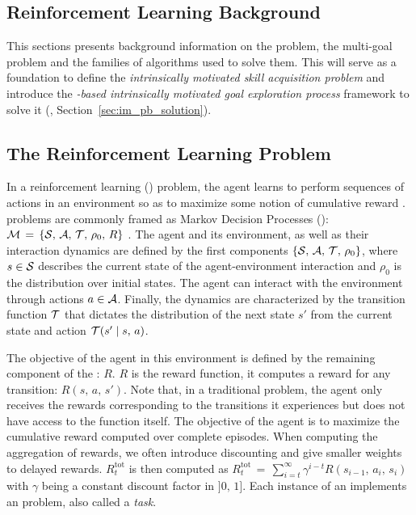 

\subsection{Reinforcement Learning Background}
\label{sec:background}
This sections presents background information on the \rl problem, the multi-goal \rl problem and the families of algorithms used to solve them. This will serve as a foundation to define the \textit{intrinsically motivated skill acquisition problem} and introduce the  \textit{\textsl{\rl}-based intrinsically motivated goal exploration process} framework to solve it (\rlimgep, Section~\ref{sec:im_pb_solution}).

\subsection{The Reinforcement Learning Problem}
In a reinforcement learning (\rl) problem, the agent learns to perform sequences of actions in an environment so as to maximize some notion of cumulative reward \cite{sutton2018reinforcement}. \rl problems are commonly framed as Markov Decision Processes (\mdps): $\mathcal{M}\,=\,\{\mathcal{S},\,\mathcal{A},\,\mathcal{T},\,\rho_0,\,R\}$ \cite{sutton2018reinforcement}. The agent and its environment, as well as their interaction dynamics are defined by the first components $\{\mathcal{S},\,\mathcal{A},\,\mathcal{T},\,\rho_0\}$, where $s\in\mathcal{S}$ describes the current state of the agent-environment interaction and $\rho_0$ is the distribution over initial states. The agent can interact with the environment through actions $a\in\mathcal{A}$. Finally, the dynamics are characterized by the transition function $\mathcal{T}$ that dictates the distribution of the next state $s'$ from the current state and action $\mathcal{T} (s'\mid s,\,a)$. 

The objective of the agent in this environment is defined by the remaining component of the \mdp: $R$. $R$ is the reward function, it computes a reward for any transition: $R(s,\,a,\,s')$. Note that, in a traditional \rl problem, the agent only receives the rewards corresponding to the transitions it experiences but does not have access to the function itself. The objective of the agent is to maximize the cumulative reward computed over complete episodes. When computing the aggregation of rewards, we often introduce discounting and give smaller weights to delayed rewards. $R^\text{tot}_t$ is then computed as $R^\text{tot}_t\,=\,\sum_{i=t}^\infty \gamma^{i-t}  R(s_{i-1},\,a_i,\,s_i)$ with $\gamma$ being a constant discount factor in $]0,\,1]$. Each instance of an \mdp implements an \rl problem, also called a \textit{task}.

